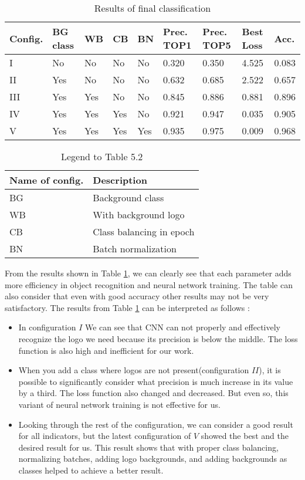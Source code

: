 \begin{table}[tbp]
	\centering
	\caption{Results of final classification}
	\label{tab:sample}
	\begin{tabular}{lllll|llll}
		\toprule
		Config.		 	& BG class 	& WB 	& CB 	& BN 	& Prec. TOP1 	& Prec. TOP5 	& 	Best Loss  	& Acc.	\\ \midrule
		I 			  	& No 		& No	& No 	& No 	& 0.320			& 0.350 		& 	4.525		& 0.083	\\
		II 			  	& Yes 		& No	& No 	& No 	& 0.632			& 0.685 		& 	2.522		& 0.657	\\
		III 			& Yes 		& Yes	& No 	& No 	& 0.845			& 0.886 		& 	0.881		& 0.896	\\
		IV 				& Yes 		& Yes	& Yes 	& No 	& 0.921			& 0.947 		& 	0.035		& 0.905	\\
		V 				& Yes		& Yes	& Yes	& Yes	& 0.935			& 0.975			& 	0.009		& 0.968	\\
		\bottomrule
	\end{tabular}
\end{table}

\begin{table}
	\centering
	\caption{Legend to Table 5.2}
	\begin{tabular}{ll}
		\toprule
		Name of config. & Description 				\\ \midrule
		BG 				& Background class 			\\
		WB				& With background logo 		\\
		CB 				& Class balancing in epoch 	\\
		BN 				& Batch normalization		\\
		\bottomrule
	\end{tabular}
	
\end{table}


\par From the results shown in Table \ref{tab:sample}, we can clearly see that each parameter adds more efficiency in object recognition and neural network training. The table can also consider that even with good accuracy other results may not be very satisfactory. The results from Table \ref{tab:sample} can be interpreted as follows :
\begin{itemize}
	\item In configuration $I$ We can see that CNN can not properly and effectively recognize the logo we need because its precision is below the middle. The loss function is also high and inefficient for our work.
	\item When you add a class where logos are not present(configuration $II$), it is possible to significantly consider what precision is much increase in its value by a third. The loss function also changed and decreased. But even so, this variant of neural network training is not effective for us.
	\item Looking through the rest of the configuration, we can consider a good result for all indicators, but the latest configuration of $V$ showed the best and the desired result for us. This result shows that with proper class balancing, normalizing batches, adding logo backgrounds, and adding backgrounds as classes helped to achieve a better result.
\end{itemize}


